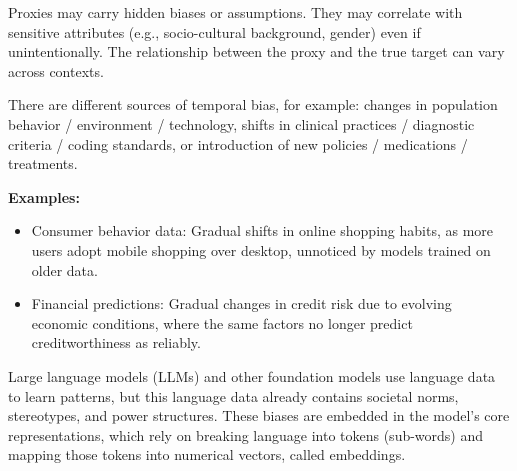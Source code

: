 \documentclass{article}
\begin{document}

Proxies may carry hidden biases or assumptions. They may correlate with sensitive attributes (e.g., socio-cultural background, gender) even if unintentionally. The relationship between the proxy and the true target can vary across contexts.


There are different sources of temporal bias, for example: changes in population behavior / environment / technology, shifts in clinical practices / diagnostic criteria / coding standards, or introduction of new policies / medications / treatments.

\textbf{Examples:}
\begin{itemize}
    \item Consumer behavior data: Gradual shifts in online shopping habits, as more users adopt mobile shopping over desktop, unnoticed by models trained on older data.
    \item Financial predictions: Gradual changes in credit risk due to evolving economic conditions, where the same factors no longer predict creditworthiness as reliably.
\end{itemize}




Large language models (LLMs) and other foundation models use language data to learn patterns, but this language data already contains societal norms, stereotypes, and power structures. These biases are embedded in the model’s core representations, which rely on breaking language into tokens (sub-words) and mapping those tokens into numerical vectors, called embeddings.
\end{document}
